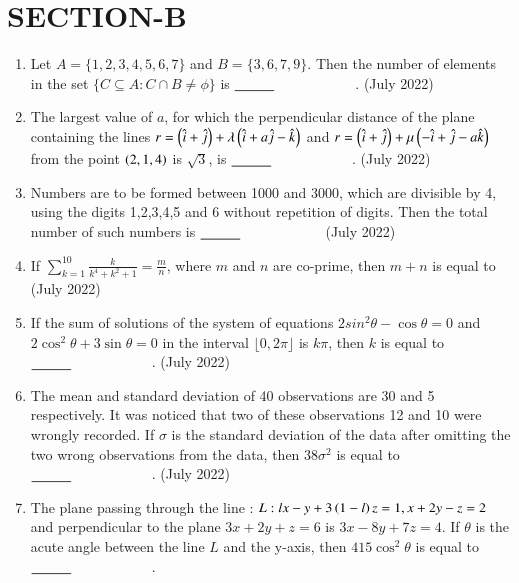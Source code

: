 \documentclass[journal,12pt,onecolumn]{IEEEtran}
\theoremstyle{remark}
\begin{document}
    \section{SECTION-B}
    \begin{enumerate}
        \item Let $A=\{1,2,3,4,5,6,7\}$ and $B=\{3,6,7,9\}$. Then the number of elements in the set $\{C\subseteq A: C \cap B \neq \phi\}$ is $\makebox[3cm][l]{\underline{\hspace{1cm}}}$.
 \hfill{(July 2022)} 
 \item The largest value of $a$, for which the perpendicular distance of the plane containing the lines $r=\left(\hat{i}+\hat{j}\right)+\lambda\left(\hat{i}+a\hat{j}-\hat{k}\right)$ and $r=\left(\hat{i}+\hat{j}\right)+\mu\left(-\hat{i}+\hat{j}-a\hat{k}\right)$ from the point $\left(2,1,4\right)$ is $\sqrt{3}$, is $\makebox[3cm][l]{\underline{\hspace{1cm}}}$.  
 \hfill{(July 2022)} 
 \item Numbers are to be formed between 1000 and 3000, which are divisible by 4, using the digits 1,2,3,4,5 and 6 without repetition of digits. Then the total number of such numbers is $\makebox[3cm][l]{\underline{\hspace{1cm}}}$
	\hfill{(July 2022)} 
 \item If $\sum_{k=1}^{10}\frac{k}{k^4+k^2+1}=\frac{m}{n}$, where $m$ and $n$ are co-prime, then $m+n$ is equal to
 \hfill{(July 2022)} 
 \item If the sum of solutions of the system of equations $2sin^{2}\theta-\cos\theta=0$ and $2\cos^{2}\theta+3\sin \theta=0$ in the interval $\lfloor 0,2\pi \rfloor$ is $k\pi$, then $k$ is equal to $\makebox[3cm][l]{\underline{\hspace{1cm}}}$.
 \hfill{(July 2022)} 
 \item The mean and standard deviation of 40 observations are 30 and 5 respectively. It was noticed that two of these observations 12 and 10 were wrongly recorded. If $\sigma$ is the standard deviation of the data after omitting the two wrong observations from the data, then $38\sigma^{2}$ is equal to $\makebox[3cm][l]{\underline{\hspace{1cm}}}$.
 \hfill{(July 2022)} 
 \item The plane passing through the line : $L:lx-y+3\left(1-l\right)z=1,x+2y-z=2$ and perpendicular to the plane $3x+2y+z=6$ is $3x-8y+7z=4$. If $\theta$ is the acute angle between the line $L$ and the y-axis, then $415\cos^{2}\theta$ is equal to $\makebox[3cm][l]{\underline{\hspace{1cm}}}$.

\end{enumerate}
\end{document}

